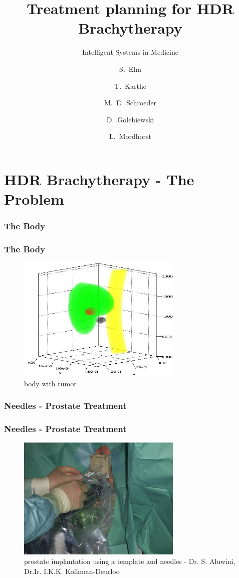 \documentclass{beamer}
\author[Elm-Karthe-Golebiewski-Schröder-Mordhorst]
{S.~Elm \and
T.~Karthe \and
M.~E.~Schroeder \and
D.~Golebiewski \and
L.~Mordhorst}
\title{Treatment planning for HDR Brachytherapy}
\subtitle{Intelligent Systems in Medicine}
\begin{document}
\begin{frame}
\titlepage
\end{frame}
\frame{\tableofcontents}

\section{HDR Brachytherapy - The Problem}
\frame{\tableofcontents[currentsection]}
\subsubsection*{The Body}
\begin{frame}
\frametitle{The Body}
\begin{figure}[h] 
  \centering
     \includegraphics[width=0.7\textwidth]{pictures/body.JPG}
  \caption{body with tumor}
  \label{fig:body}
\end{figure}
\end{frame}

\subsubsection*{Needles - Prostate Treatment}
\begin{frame}
\frametitle{Needles - Prostate Treatment}
\begin{figure}[h] 
  \centering
     \includegraphics[width=0.7\textwidth]{pictures/prost.JPG}
  \caption{prostate implantation using a template and needles - Dr. S. Aluwini, Dr.Ir. I.K.K. Kolkman-Deurloo}
  \label{fig:prost}
\end{figure}
\end{frame}
\end{document}
